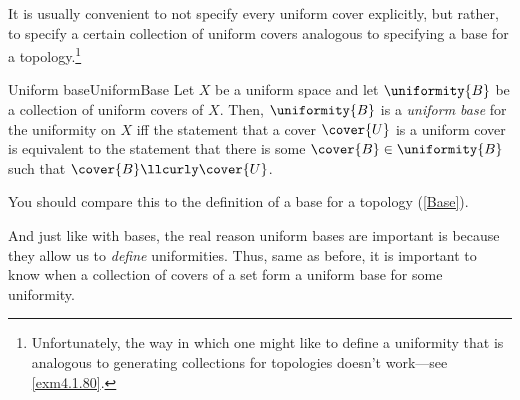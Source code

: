 It is usually convenient to not specify every uniform cover explicitly, but rather, to specify a certain collection of uniform covers analogous to specifying a base for a topology.\footnote{Unfortunately, the way in which one might like to define a uniformity that is analogous to generating collections for topologies doesn't work---see \cref{exm4.1.80}.}
\begin{dfn}{Uniform base}{UniformBase}
Let $X$ be a uniform space and let $\uniformity{B}$ be a collection of uniform covers of $X$.  Then, $\uniformity{B}$ is a \emph{uniform base} for the uniformity on $X$ iff the statement that a cover $\cover{U}$ is a uniform cover is equivalent to the statement that there is some $\cover{B}\in \uniformity{B}$ such that $\cover{B}\llcurly \cover{U}$.
\begin{rmk}
You should compare this to the definition of a base for a topology (\cref{Base}).
\end{rmk}
\end{dfn}
And just like with bases, the real reason uniform bases are important is because they allow us to \emph{define} uniformities.  Thus, same as before, it is important to know when a collection of covers of a set form a uniform base for some uniformity.
